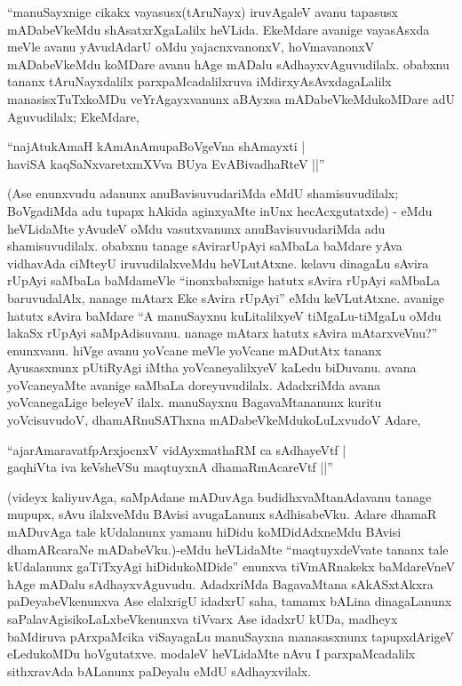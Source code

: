 ``manuSayxnige cikakx vayasusx(tAruNayx) iruvAgaleV avanu tapasusx mADabeVkeMdu shAsatxrXgaLalilx heVLida. EkeMdare avanige vayasAsxda meVle avanu yAvudAdarU oMdu yajacnxvanonxV, hoVmavanonxV mADabeVkeMdu koMDare avanu hAge mADalu sAdhayxvAguvudilalx. obabxnu tananx tAruNayxdalilx parxpaMcadalilxruva iMdirxyAsAvxdagaLalilx manasisxTuTxkoMDu veYrAgayxvanunx aBAyxsa mADabeVkeMdukoMDare adU Aguvudilalx; EkeMdare,

\begin{shloka}
``najAtukAmaH kAmAnAmupaBoVgeVna shAmayxti |\\
haviSA kaqSaNxvaretxmXVva BUya EvABivadhaRteV ||''
\end{shloka}

(Ase enunxvudu adanunx anuBavisuvudariMda eMdU shamisuvudilalx; BoVgadiMda adu tupapx hAkida aginxyaMte inUnx hecAcxgutatxde) - eMdu heVLidaMte yAvudeV oMdu vasutxvanunx anuBavisuvudariMda adu shamisuvudilalx. obabxnu tanage sAvirarUpAyi saMbaLa baMdare yAva vidhavAda ciMteyU iruvudilalxveMdu heVLutAtxne. kelavu dinagaLu sAvira rUpAyi saMbaLa baMdameVle ``inonxbabxnige hatutx sAvira rUpAyi saMbaLa baruvudalAlx, nanage mAtarx Eke sAvira rUpAyi'' eMdu keVLutAtxne. avanige hatutx sAvira baMdare ``A manuSayxnu kuLitalilxyeV tiMgaLu-tiMgaLu oMdu lakaSx rUpAyi saMpAdisuvanu. nanage mAtarx hatutx sAvira mAtarxveVnu?'' enunxvanu. hiVge avanu yoVcane meVle yoVcane mADutAtx tananx Ayusasxnunx pUtiRyAgi iMtha yoVcaneyalilxyeV kaLedu biDuvanu. avana yoVcaneyaMte avanige saMbaLa doreyuvudilalx. AdadxriMda avana yoVcanegaLige beleyeV ilalx. manuSayxnu BagavaMtananunx kuritu yoVcisuvudoV, dhamARnuSAThxna mADabeVkeMdukoLuLxvudoV Adare,

\begin{shloka}
``ajarAmaravatfpArxjocnxV vidAyxmathaRM ca sAdhayeVtf |\\
gaqhiVta iva keVsheVSu maqtuyxnA dhamaRmAcareVtf ||''
\end{shloka}

(videyx kaliyuvAga, saMpAdane mADuvAga budidhxvaMtanAdavanu tanage mupupx, sAvu ilalxveMdu BAvisi avugaLanunx sAdhisabeVku. Adare dhamaR mADuvAga tale kUdalanunx yamanu hiDidu koMDidAdxneMdu BAvisi dhamARcaraNe mADabeVku.)-eMdu heVLidaMte ``maqtuyxdeVvate tananx tale kUdalanunx gaTiTxyAgi hiDidukoMDide'' enunxva tiVmARnakekx baMdareVneV hAge mADalu sAdhayxvAguvudu. AdadxriMda BagavaMtana sAkASxtAkxra paDeyabeVkenunxva Ase elalxrigU idadxrU saha, tamamx bALina dinagaLanunx saPalavAgisikoLaLxbeVkenunxva tiVvarx Ase idadxrU kUDa, madheyx baMdiruva pArxpaMcika viSayagaLu manuSayxna manasasxnunx tapupxdArigeV eLedukoMDu hoVgutatxve. modaleV heVLidaMte nAvu I parxpaMcadalilx sithxravAda bALanunx paDeyalu eMdU sAdhayxvilalx.

